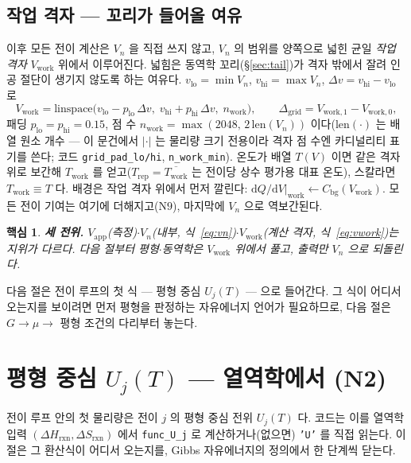 \documentclass[11pt,a4paper]{article}
\newtheorem*{keybox}{핵심}
\newcommand{\dd}{\mathrm{d}}
\newcommand{\app}{\mathrm{app}}
\newcommand{\bg}{\mathrm{bg}}
\newcommand{\rxn}{\mathrm{rxn}}
\newcommand{\work}{\mathrm{work}}
\newcommand{\code}[1]{\texttt{#1}}
\begin{document}
\subsection{작업 격자 — 꼬리가 들어올 여유}
이후 모든 전이 계산은 $V_n$ 을 직접 쓰지 않고, $V_n$ 의 범위를 양쪽으로 넓힌 균일 \emph{작업 격자} $V_\work$ 위에서
이루어진다. 넓힘은 동역학 꼬리(\S\ref{sec:tail})가 격자 밖에서 잘려 인공 절단이 생기지 않도록 하는 여유다.
$v_\mathrm{lo}=\min V_n$, $v_\mathrm{hi}=\max V_n$, $\Delta v=v_\mathrm{hi}-v_\mathrm{lo}$ 로
\begin{equation}
V_\work=\mathrm{linspace}\big(v_\mathrm{lo}-p_\mathrm{lo}\,\Delta v,\;
v_\mathrm{hi}+p_\mathrm{hi}\,\Delta v,\;n_\work\big),
\qquad \Delta_\mathrm{grid}=V_{\work,1}-V_{\work,0},
\label{eq:vwork}
\end{equation}
패딩 $p_\mathrm{lo}=p_\mathrm{hi}=0.15$, 점 수 $n_\work=\max(2048,\,2\,\mathrm{len}(V_n))$ 이다($\mathrm{len}(\cdot)$ 는 배열 원소 개수 — 이 문건에서 $|\cdot|$ 는 물리량 크기 전용이라 격자 점 수엔 카디널리티 표기를 쓴다; 코드 \code{grid\_pad\_lo/hi},
\code{n\_work\_min}). 온도가 배열 $T(V)$ 이면 같은 격자 위로 보간해 $T_\work$ 를 얻고($T_\mathrm{rep}=\overline{T_\work}$ 는
전이당 상수 평가용 대표 온도), 스칼라면 $T_\work\equiv T$ 다. 배경은 작업 격자 위에서 먼저 깔린다:
$\dd Q/\dd V|_\work \leftarrow C_\bg(V_\work)$. 모든 전이 기여는 여기에 더해지고($\mathrm N9$), 마지막에 $V_n$ 으로
역보간된다.

\begin{keybox}
\textbf{세 전위.} $V_\app$(측정)$\cdot$$V_n$(내부, 식~\eqref{eq:vn})$\cdot$$V_\work$(계산 격자, 식~\eqref{eq:vwork})는
지위가 다르다. 다음 절부터 평형$\cdot$동역학은 $V_\work$ 위에서 풀고, 출력만 $V_n$ 으로 되돌린다.
\end{keybox}

다음 절은 전이 루프의 첫 식 — 평형 중심 $U_j(T)$ — 으로 들어간다. 그 식이 어디서 오는지를 보이려면 먼저 평형을
판정하는 자유에너지 언어가 필요하므로, 다음 절은 $G\to\mu\to$ 평형 조건의 다리부터 놓는다.

\section{평형 중심 $U_j(T)$ — 열역학에서 (N2)}\label{sec:center}
전이 루프 안의 첫 물리량은 전이 $j$ 의 평형 중심 전위 $U_j(T)$ 다. 코드는 이를 열역학 입력 $(\Delta H_\rxn,\Delta S_\rxn)$
에서 \code{func\_U\_j} 로 계산하거나(없으면) \code{'U'} 를 직접 읽는다. 이 절은 그 환산식이 어디서 오는지를, Gibbs
자유에너지의 정의에서 한 단계씩 닫는다.
\end{document}
